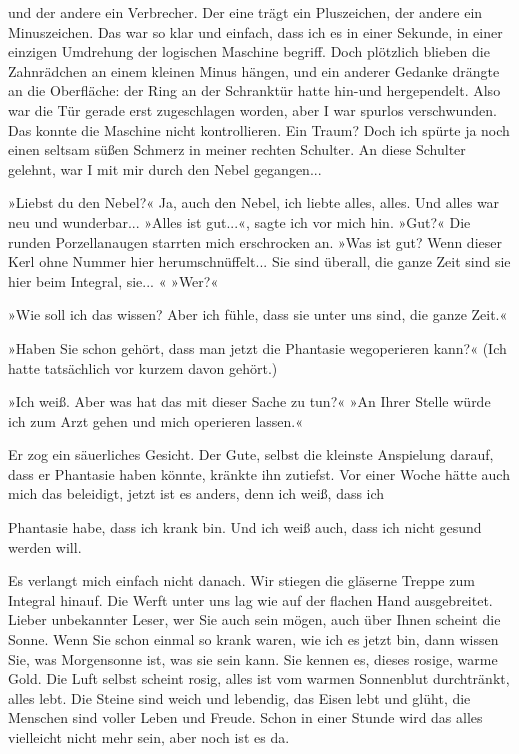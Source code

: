 und der andere ein Verbrecher. Der eine trägt ein Pluszeichen, der
andere ein Minuszeichen. Das war so klar und einfach, dass ich es
in einer Sekunde, in einer einzigen Umdrehung der logischen
Maschine begriff. Doch plötzlich blieben die Zahnrädchen an einem
kleinen Minus hängen, und ein anderer Gedanke drängte an die
Oberfläche: der Ring an der Schranktür hatte hin-und hergependelt.
Also war die Tür gerade erst zugeschlagen worden, aber I war
spurlos verschwunden. Das konnte die Maschine nicht kontrollieren.
Ein Traum? Doch ich spürte ja noch einen seltsam süßen Schmerz in
meiner rechten Schulter. An diese Schulter gelehnt, war I mit mir
durch den Nebel gegangen...

»Liebst du den Nebel?« Ja, auch den Nebel, ich liebte alles, alles.
Und alles war neu und wunderbar... »Alles ist gut...«, sagte ich
vor mich hin. »Gut?« Die runden Porzellanaugen starrten mich
erschrocken an. »Was ist gut? Wenn dieser Kerl ohne Nummer hier
herumschnüffelt... Sie sind überall, die ganze Zeit sind sie hier
beim Integral, sie... « »Wer?«

»Wie soll ich das wissen? Aber ich fühle, dass sie unter uns sind,
die ganze Zeit.«

»Haben Sie schon gehört, dass man jetzt die Phantasie wegoperieren
kann?« (Ich hatte tatsächlich vor kurzem davon gehört.)

»Ich weiß. Aber was hat das mit dieser Sache zu tun?« »An Ihrer
Stelle würde ich zum Arzt gehen und mich operieren lassen.«

Er zog ein säuerliches Gesicht. Der Gute, selbst die kleinste
Anspielung darauf, dass er Phantasie haben könnte, kränkte ihn
zutiefst. Vor einer Woche hätte auch mich das beleidigt, jetzt ist
es anders, denn ich weiß, dass ich

Phantasie habe, dass ich krank bin. Und ich weiß auch, dass ich
nicht gesund werden will.

Es verlangt mich einfach nicht danach. Wir stiegen die gläserne
Treppe zum Integral hinauf. Die Werft unter uns lag wie auf der
flachen Hand ausgebreitet. Lieber unbekannter Leser, wer Sie auch
sein mögen, auch über Ihnen scheint die Sonne. Wenn Sie schon
einmal so krank waren, wie ich es jetzt bin, dann wissen Sie, was
Morgensonne ist, was sie sein kann. Sie kennen es, dieses rosige,
warme Gold. Die Luft selbst scheint rosig, alles ist vom warmen
Sonnenblut durchtränkt, alles lebt. Die Steine sind weich und
lebendig, das Eisen lebt und glüht, die Menschen sind voller Leben
und Freude. Schon in einer Stunde wird das alles vielleicht nicht
mehr sein, aber noch ist es da.

